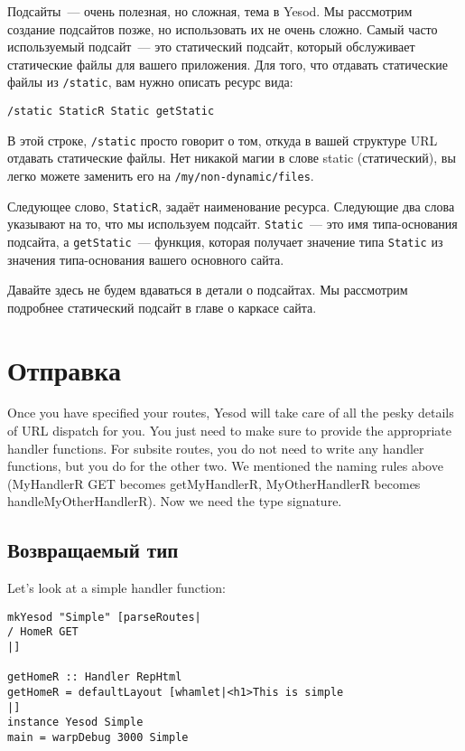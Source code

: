 Подсайты~--- очень полезная, но сложная, тема в Yesod. Мы рассмотрим
создание подсайтов позже, но использовать их не очень сложно. Самый
часто используемый подсайт~--- это статический подсайт, который
обслуживает статические файлы для вашего приложения. Для того, что
отдавать статические файлы из \lstinline!/static!, вам нужно описать
ресурс вида:
\begin{verbatim}
/static StaticR Static getStatic
\end{verbatim}

В этой строке, \lstinline!/static! просто говорит о том, откуда в вашей
структуре URL отдавать статические файлы. Нет никакой магии в слове
static (статический), вы легко можете заменить его на
\lstinline!/my/non-dynamic/files!.

Следующее слово, \lstinline!StaticR!, задаёт наименование
ресурса. Следующие два слова указывают на то, что мы используем
подсайт. \lstinline!Static!~--- это имя типа-основания подсайта, а
\lstinline!getStatic!~--- функция, которая получает значение типа
\lstinline!Static! из значения типа-основания вашего основного сайта.

Давайте здесь не будем вдаваться в детали о подсайтах. Мы рассмотрим
подробнее статический подсайт в главе о каркасе
сайта.

\section{Отправка}
Once you have specified your routes, Yesod will take care of all the
pesky details of URL dispatch for you. You just need to make sure to
provide the appropriate handler functions. For subsite routes, you do
not need to write any handler functions, but you do for the other
two. We mentioned the naming rules above (MyHandlerR GET becomes
getMyHandlerR, MyOtherHandlerR becomes handleMyOtherHandlerR). Now we
need the type signature.

\subsection{Возвращаемый тип}

Let's look at a simple handler function:

\begin{lstlisting}
mkYesod "Simple" [parseRoutes|
/ HomeR GET
|]

getHomeR :: Handler RepHtml
getHomeR = defaultLayout [whamlet|<h1>This is simple
|]
instance Yesod Simple
main = warpDebug 3000 Simple
\end{lstlisting}

